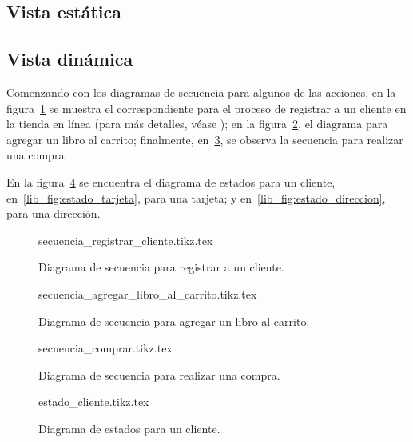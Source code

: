 \subsection{Vista estática}

\subsection{Vista dinámica}
Comenzando con los diagramas de secuencia para algunos de las acciones, en la
figura~\ref{lib_fig:secuencia_registrar_cliente} se muestra el correspondiente
para el proceso de registrar a un cliente en la tienda en línea (para más
detalles, véase ); en la
figura~\ref{lib_fig:secuencia_agregar_libro_al_carrito}, el diagrama para
agregar un libro al carrito; finalmente, en~\ref{lib_fig:secuencia_comprar},
se observa la secuencia para realizar una compra.

En la figura~\ref{lib_fig:estado_cliente} se encuentra el diagrama de estados
para un cliente, en~\ref{lib_fig:estado_tarjeta}, para una tarjeta; y
en~\ref{lib_fig:estado_direccion}, para una dirección.

\begin{figure}
  \begin{center}
    {secuencia_registrar_cliente.tikz.tex}
    \caption{Diagrama de secuencia para registrar a un cliente.}
    \label{lib_fig:secuencia_registrar_cliente}
  \end{center}
\end{figure}

\begin{figure}
  \begin{center}
    {secuencia_agregar_libro_al_carrito.tikz.tex}
    \caption{Diagrama de secuencia para agregar un libro al carrito.}
    \label{lib_fig:secuencia_agregar_libro_al_carrito}
  \end{center}
\end{figure}

\begin{figure}
  \begin{center}
    {secuencia_comprar.tikz.tex}
    \caption{Diagrama de secuencia para realizar una compra.}
    \label{lib_fig:secuencia_comprar}
  \end{center}
\end{figure}

\begin{figure}
  \begin{center}
    {estado_cliente.tikz.tex}
    \caption{Diagrama de estados para un cliente.}
    \label{lib_fig:estado_cliente}
  \end{center}
\end{figure}

